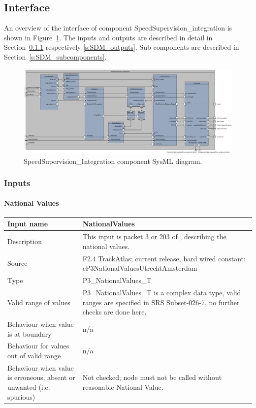 \subsection{Interface}

An overview of the interface of component SpeedSupervision\_integration is shown in Figure~\ref{f:ssv}. The inputs and outputs are described in detail in Section~\ref{s:SDM_inputs} respectively \ref{s:SDM_outputs}. Sub components are described in Section~\ref{s:SDM_subcomponents}.

\begin{figure}
\centering
\includegraphics[width=0.95\textheight, angle=90]{../images/F2_7_SpeedSupervision_Integration.pdf}
\caption{SpeedSupervision\_Integration component SysML diagram.}\label{f:ssv}
\end{figure}



\subsubsection{Inputs}\label{s:SDM_inputs}

\paragraph{National Values}

\begin{longtable}{p{}p{}}
\toprule
Input name				& NationalValues \\
\midrule
Description				& This input is packet 3 or 203 of \cite[Chapt.~8]{subset-026}, describing the national values.  \\
\midrule
Source					& F2.4 TrackAtlas; current release, hard wired constant: cP3NationalValuesUtrechtAmsterdam \\
\midrule
Type					& P3\_NationalValues\_T \\
\midrule
Valid range of values	& P3\_NationalValues\_T is a complex data type, valid ranges are specified in SRS Subset-026-7, no further checks are done here. \\
\midrule
Behaviour when value is at boundary	& n/a \\
\midrule
Behaviour for values out of valid range	& n/a \\
\midrule
Behaviour when value is erroneous, absent or unwanted (i.e. spurious) & Not checked; node must not be called without reasonable National Value. \\
\bottomrule
\end{longtable}


